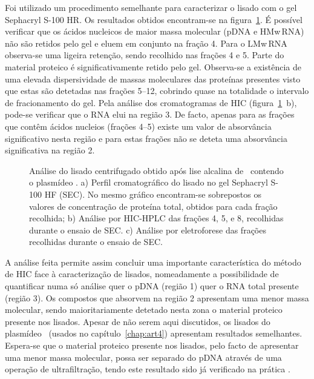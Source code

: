 Foi utilizado um procedimento semelhante para caracterizar o lisado com o gel Sephacryl S-100 HR. Os resultados obtidos encontram-se na figura~\ref{fig:s100}. É possível verificar que os ácidos nucleicos de maior massa molecular (pDNA e HMw\,RNA) não são retidos pelo gel e eluem em conjunto na fração 4. Para o LMw\,RNA observa-se uma ligeira retenção, sendo recolhido nas frações 4 e 5. Parte do material proteico é significativamente retido pelo gel. Observa-se a existência de uma elevada dispersividade de massas moleculares das proteínas presentes visto que estas são detetadas nas frações 5--12, cobrindo quase na totalidade o intervalo de fracionamento do gel. Pela análise dos cromatogramas de HIC (figura~\ref{fig:s100}~b), pode-se verificar que o RNA elui na região 3. De facto, apenas para as frações que contêm ácidos nucleios (frações 4--5) existe um valor de absorvância significativo nesta região e para estas frações não se deteta uma absorvância significativa na região 2.        
\begin{figure}[!t]
    \centering
    
    \caption[Análise do lisado centrifugado com o gel Sephacryl S-100.]{Análise do lisado centrifugado obtido após lise alcalina de \ecoli\ contendo o plasmídeo \pVAX. a) Perfil cromatográfico do lisado no gel Sephacryl S-100 HF (SEC). No mesmo gráfico encontram-se sobrepostos os valores de concentração de proteína total, obtidos para cada fração recolhida; b) Análise por HIC-HPLC das frações 4, 5, e 8, recolhidas durante o ensaio de SEC. c) Análise por eletroforese das frações recolhidas durante o ensaio de SEC.}
    \label{fig:s100}
\end{figure}

A análise feita permite assim concluir uma importante característica do método de HIC face à caracterização de lisados, nomeadamente a possibilidade de quantificar numa só análise quer o pDNA (região 1) quer o RNA total presente (região 3). Os compostos que absorvem na região 2 apresentam uma menor massa molecular, sendo maioritariamente detetado nesta zona o material proteico presente nos lisados. Apesar de não serem aqui discutidos, os lisados do plasmídeo \pCAMBIA\ (usados no capítulo~\ref{chap:art4}) apresentam resultados semelhantes. Espera-se que o material proteico presente nos lisados, pelo facto de apresentar uma menor massa molecular, possa ser separado do pDNA através de uma operação de ultrafiltração, tendo este resultado sido já verificado na prática \cite{duvaltff,freitas}.  

